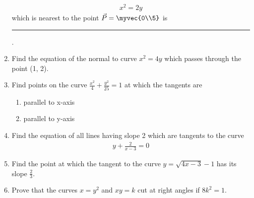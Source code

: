 \begin{enumerate}[label=\thesubsection.\arabic*,ref=\thesubsection.\theenumi]
\begin{align}
        x^2 = 2y
        \label{eq:chapters/12/6/5/27/curve}
    \end{align}
    which is nearest to the point 
    $\vec{P} = \myvec{0\\5}$ is \rule{1cm}{0.1pt}.
    \\
    \solution 

\item 
Find the equation of the normal to curve $x^2 = 4y$ which passes through the point
(1, 2).
\\
\solution 
\label{chapters/12/6/6/4}

\item 
 Find points on the curve $\frac{x^2}{4}+\frac{y^2}{25}=1$ at which the tangents are 
 \begin{enumerate}
	 \item parallel to x-axis\\  
	 \item parallel to y-axis
 \end{enumerate}
\item 
Find the equation of all lines having slope 2 which are tangents to the curve 
\begin{align}
y+\frac{2}{x-3} = 0
\end{align}
\item 
Find the point at which the tangent to the curve 
	$y = \sqrt{4x-3}-1$
	has its slope $\frac{2}{3}$.
\item	Prove that the curves $x = y^2$ and $xy = k$ cut at right angles if $8k^2 = 1$.
\end{enumerate}
